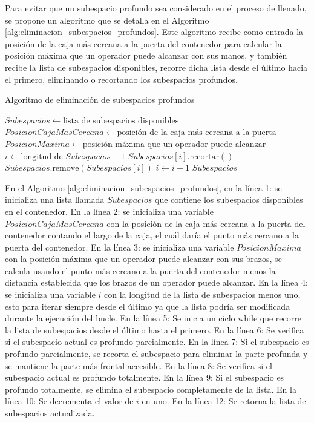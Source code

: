 \documentclass[openany]{article}
\begin{document}
Para evitar que un subespacio profundo sea considerado en el proceso de llenado, se propone un algoritmo que se detalla en el Algoritmo \ref{alg:eliminacion_subespacios_profundos}. Este algoritmo recibe como entrada la posición de la caja más cercana a la puerta del contenedor para calcular la posición máxima que un operador puede alcanzar con sus manos, y también recibe la lista de subespacios disponibles, recorre dicha lista desde el último hacia el primero, eliminando o recortando los subespacios profundos.

\begin{algorithm}[H]
    \caption{Algoritmo de eliminación de subespacios profundos}
    \label{alg:eliminacion_subespacios_profundos}
    \begin{algorithmic}[1]
        \State $Subespacios \gets \text{lista de subespacios disponibles}$
        \State $PosicionCajaMasCercana \gets \text{posición de la caja más cercana a la puerta}$
        \State $PosicionMaxima \gets \text{posición máxima que un operador puede alcanzar}$
        \State $i \gets \text{longitud de } Subespacios - 1$
        \State $Subespacios[i].\text{recortar}()$
        \State $Subespacios.\text{remove}(Subespacios[i])$
        \EndIf
        \State $i \gets i - 1$
        \EndWhile
        \State \Return $Subespacios$
    \end{algorithmic}
\end{algorithm}

En el Algoritmo \ref{alg:eliminacion_subespacios_profundos}, en la línea 1: se inicializa una lista llamada $Subespacios$ que contiene los subespacios disponibles en el contenedor. En la línea 2: se inicializa una variable $PosicionCajaMasCercana$ con la posición de la caja más cercana a la puerta del contenedor contando el largo de la caja, el cuál daría el punto más cercano a la puerta del contenedor. En la línea 3: se inicializa una variable $PosicionMaxima$ con la posición máxima que un operador puede alcanzar con sus brazos, se calcula usando el punto más cercano a la puerta del contenedor menos la distancia establecida que los brazos de un operador puede alcanzar. En la línea 4: se inicializa una variable $i$ con la longitud de la lista de subespacios menos uno, esto para iterar siempre desde el último ya que la lista podría ser modificada durante la ejecución del bucle. En la línea 5: Se inicia un ciclo while que recorre la lista de subespacios desde el último hasta el primero. En la línea 6: Se verifica si el subespacio actual es profundo parcialmente. En la línea 7: Si el subespacio es profundo parcialmente, se recorta el subespacio para eliminar la parte profunda y se mantiene la parte más frontal accesible. En la línea 8: Se verifica si el subespacio actual es profundo totalmente. En la línea 9: Si el subespacio es profundo totalmente, se elimina el subespacio completamente de la lista. En la línea 10: Se decrementa el valor de $i$ en uno. En la línea 12: Se retorna la lista de subespacios actualizada.
\end{document}
